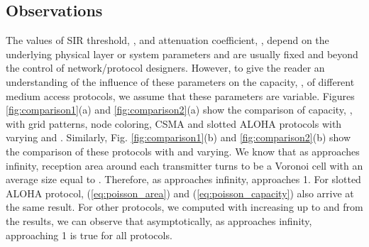 \documentclass[12pt,english]{article}
\begin{document}
\begin{figure*}[!t]
\centering
{}
\caption{Capacity, , of grid pattern (triangular, square and hexagonal) based protocols.
\label{fig:comparison1}}
\end{figure*}

\begin{figure*}[!t]
\centering
{}
\caption{Capacity, , of triangular grid (from Fig. \ref{fig:comparison1}), node coloring, CSMA and slotted ALOHA protocols.
\label{fig:comparison2}}
\end{figure*}

\subsection{Observations}

The values of SIR threshold, , and attenuation coefficient, , depend on the underlying physical layer or system parameters and are usually fixed and beyond the control of network/protocol designers. However, to give the reader an understanding of the influence of these parameters on the capacity, , of different medium access protocols, we assume that these parameters are variable. Figures \ref{fig:comparison1}(a) and \ref{fig:comparison2}(a) show the comparison of capacity, , with grid patterns, node coloring, CSMA and slotted ALOHA protocols with  varying and \mbox{}. Similarly, Fig. \ref{fig:comparison1}(b) and \ref{fig:comparison2}(b) show the comparison of these protocols with \mbox{} and  varying. We know that as  approaches infinity, reception area around each transmitter turns to be a Voronoi cell with an average size equal to . Therefore, as  approaches infinity,  approaches 1. For slotted ALOHA protocol, (\ref{eq:poisson_area}) and (\ref{eq:poisson_capacity}) also arrive at the same result. For other protocols, we computed  with  increasing up to  and from the results, we can observe that asymptotically, as  approaches infinity,  approaching 1 is true for all protocols. 
\end{document}
